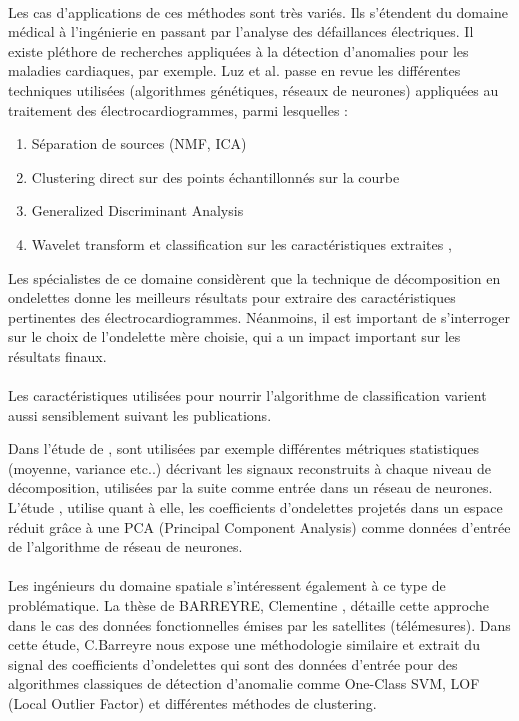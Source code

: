 \paragraph{}
Les cas d'applications de ces méthodes sont très variés. Ils s'étendent du domaine médical à l'ingénierie en passant par l'analyse des défaillances électriques. Il existe pléthore de recherches appliquées à la détection d'anomalies pour les maladies cardiaques, par exemple. Luz et al. \cite{Luz} passe en revue les différentes techniques utilisées (algorithmes génétiques, réseaux de neurones) appliquées au traitement des électrocardiogrammes, parmi lesquelles :
\begin{enumerate}
    \item Séparation de sources (NMF, ICA) %
    \item Clustering direct sur des points échantillonnés sur la courbe %
    \item Generalized Discriminant Analysis 
    \item Wavelet transform et classification sur les caractéristiques extraites \cite{Guler}, \cite{BClementine}
\end{enumerate}
Les spécialistes de ce domaine considèrent que la technique de décomposition en ondelettes donne les meilleurs résultats pour extraire des caractéristiques pertinentes des électrocardiogrammes. Néanmoins, il est important de s'interroger sur le choix de l'ondelette mère choisie, qui a un impact important sur les résultats finaux.
\paragraph{}
Les caractéristiques utilisées pour nourrir l'algorithme de classification varient aussi sensiblement suivant les publications.

Dans l'étude de \cite{Guler}, sont utilisées par exemple différentes métriques statistiques (moyenne, variance etc..) décrivant les signaux reconstruits à chaque niveau de décomposition, utilisées par la suite comme entrée dans un réseau de neurones. 
L'étude \cite{INCE}, utilise quant à elle, les coefficients d'ondelettes projetés dans un espace réduit grâce à une PCA (Principal Component Analysis) comme données d'entrée de l'algorithme de réseau de neurones.

\paragraph{}
Les ingénieurs du domaine spatiale s'intéressent également à ce type de problématique. La thèse de BARREYRE, Clementine \cite{BClementine}, détaille cette approche dans le cas des données fonctionnelles émises par les satellites (télémesures).
Dans cette étude, C.Barreyre nous expose une méthodologie similaire et extrait du signal des coefficients d'ondelettes qui sont des données d'entrée pour des algorithmes classiques de détection d'anomalie comme  One-Class SVM, LOF (Local Outlier Factor) et différentes méthodes de clustering.


